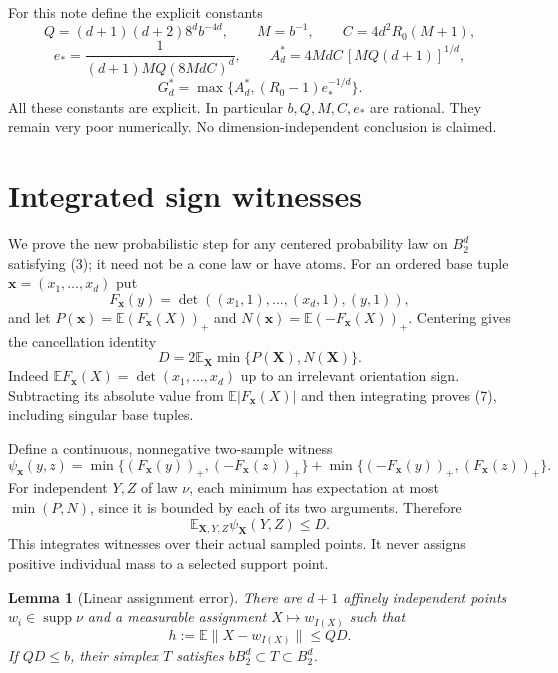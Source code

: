 \documentclass[11pt]{article}
\newtheorem{lemma}[theorem]{Lemma}
\newcommand{\supp}{\operatorname{supp}}
\newcommand{\E}{\mathbb E}
\newcommand{\B}{B_2^d}
\newcommand{\pos}[1]{(#1)_+}
\begin{document}
For this note define the explicit constants
\[
 Q=(d+1)(d+2)8^d b^{-4d},\qquad M=b^{-1},
 \qquad C=4d^2R_0(M+1),
 \tag{4}
\]
\[
 e_*=\frac1{(d+1)MQ(8MdC)^d},\qquad
 A_d^*=4MdC\,[MQ(d+1)]^{1/d},
 \tag{5}
\]
\[
 G_d^*=\max\{A_d^*,(R_0-1)e_*^{-1/d}\}.
 \tag{6}
\]
All these constants are explicit. In particular $b,Q,M,C,e_*$ are rational.
They remain very poor numerically. No dimension-independent conclusion is
claimed.

\section{Integrated sign witnesses}

We prove the new probabilistic step for any centered probability law on
$\B$ satisfying (3); it need not be a cone law or have atoms. For an ordered
base tuple $\mathbf x=(x_1,\ldots,x_d)$ put
\[
 F_{\mathbf x}(y)=\det((x_1,1),\ldots,(x_d,1),(y,1)),
\]
and let $P(\mathbf x)=\E\pos{F_{\mathbf x}(X)}$ and
$N(\mathbf x)=\E\pos{-F_{\mathbf x}(X)}$.
Centering gives the cancellation identity
\[
 D=2\E_{\mathbf X}\min\{P(\mathbf X),N(\mathbf X)\}.
 \tag{7}
\]
Indeed $\E F_{\mathbf x}(X)=\det(x_1,\ldots,x_d)$ up to an irrelevant
orientation sign. Subtracting its absolute value from $\E|F_{\mathbf x}(X)|$
and then integrating proves (7), including singular base tuples.

Define a continuous, nonnegative two-sample witness
\[
 \psi_{\mathbf x}(y,z)=
 \min\{\pos{F_{\mathbf x}(y)},\pos{-F_{\mathbf x}(z)}\}
 +\min\{\pos{-F_{\mathbf x}(y)},\pos{F_{\mathbf x}(z)}\}.
 \tag{8}
\]
For independent $Y,Z$ of law $\nu$, each minimum has expectation at most
$\min(P,N)$, since it is bounded by each of its two arguments. Therefore
\[
 \E_{\mathbf X,Y,Z}\psi_{\mathbf X}(Y,Z)\le D.
 \tag{9}
\]
This integrates witnesses over their actual sampled points. It never
assigns positive individual mass to a selected support point.

\begin{lemma}[Linear assignment error]\label{lem:linear}
There are $d+1$ affinely independent points $w_i\in\supp\nu$ and a measurable
assignment $X\mapsto w_{I(X)}$ such that
\[
 h:=\E\|X-w_{I(X)}\|\le QD.
 \tag{10}
\]
If $QD\le b$, their simplex $T$ satisfies $b\B\subset T\subset\B$.
\end{lemma}
\end{document}
